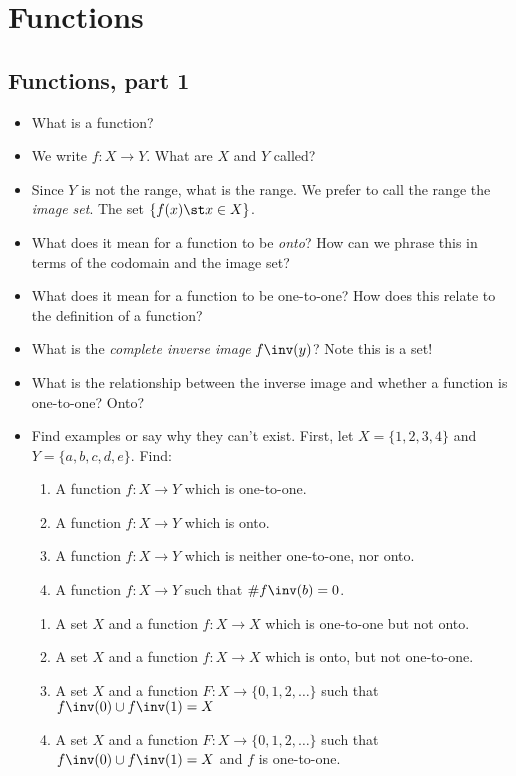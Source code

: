 
\section{Functions}

\subsection*{Functions, part 1}

\begin{itemize}
\item What is a function?
\item We write $f: X \to Y$.  What are $X$ and $Y$ called?
\item Since $Y$ is not the range, what is the range.  We prefer to call the range the {\em image set}.  The set $\{f(x) \st x \in X\}$.
\item What does it mean for a function to be {\em onto}?  How can we phrase this in terms of the codomain and the image set?
\item What does it mean for a function to be one-to-one?  How does this relate to the definition of a function?
\item What is the {\em complete inverse image} $f\inv(y)$?  Note this is a set!
\item What is the relationship between the inverse image and whether a function is one-to-one?  Onto?
\item Find examples or say why they can't exist.  First, let $X = \{1, 2, 3, 4\}$ and $Y = \{a, b, c, d, e\}$.  Find:
\renewcommand{\labelenumi}{(\alph{enumi})}
\begin{enumerate}
 \item A function $f: X \to Y$ which is one-to-one.
 \item A function $f: X \to Y$ which is onto.
  \item A function $f: X \to Y$ which is neither one-to-one, nor onto.
 \item A function $f: X \to Y$ such that $\#f\inv(b) = 0$.
 \end{enumerate}
 \begin{enumerate}
  \item A set $X$ and a function $f: X \to X$ which is one-to-one but not onto.
  \item A set $X$ and a function $f: X \to X$ which is onto, but not one-to-one.
  
  \item A set $X$ and a function $F: X \to \{0,1,2, \ldots\}$ such that $f\inv(0) \cup f\inv(1) = X$
  
  \item A set $X$ and a function $F: X\to\{0,1,2,\ldots\}$ such that $f\inv(0) \cup f\inv(1) = X$ and $f$ is one-to-one.
  
\end{enumerate}

\end{itemize}



